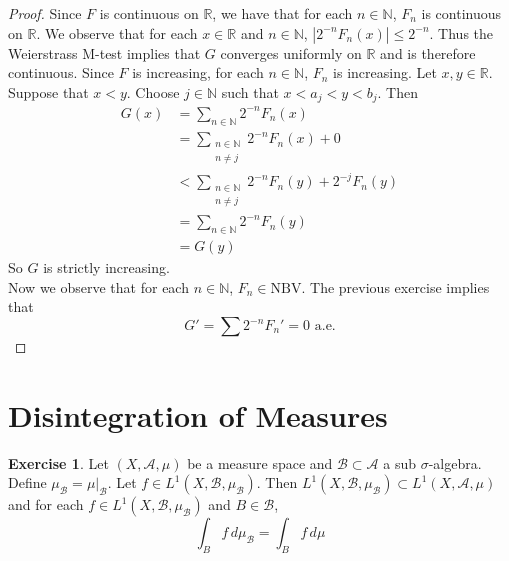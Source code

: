 \documentclass{book}
\theoremstyle{definition}
\newtheorem{ex}[definition]{Exercise}
\newcommand{\sig}{\sigma}
\newcommand{\N}{\mathbb{N}}
\newcommand{\R}{\mathbb{R}}
\newcommand{\MA}{\mathcal{A}}
\newcommand{\MB}{\mathcal{B}}
\newcommand{\lex}[1]{\label{ex:#1}}
\DeclareMathOperator*{\0}{\mbf{0}}
\DeclareMathOperator*{\1}{\mbf{1}}
\newcommand{\dmu}{\, d \mu}
\newcommand{\NBV}{\text{NBV}}
\begin{document}
	\begin{proof}
		Since $F$ is continuous on $\R$, we have that for each $n \in \N$, $F_n$ is continuous on $\R$. We observe that for each $x \in \R$ and $n \in \N$, $|2^{-n}F_n(x)| \leq 2^{-n}$. Thus the Weierstrass M-test implies that $G$ converges uniformly on $\R$ and is therefore continuous. Since $F$ is increasing, for each $n \in \N$, $F_n$ is increasing. Let $x, y \in \R$. Suppose that $x<y$. Choose $j \in \N$ such that $x<a_j<y<b_j$. Then 
		\begin{align*}
			G(x) 
			&= \sum_{n \in \N}2^{-n}F_n(x)\\
			&= \sum_{\substack{n \in \N\\ n \neq j}}2^{-n}F_n(x) + 0\\
			& < \sum_{\substack{n \in \N\\ n \neq j}}2^{-n}F_n(y) + 2^{-j}F_n(y)\\
			&=\sum_{n \in \N}2^{-n}F_n(y)\\
			&=G(y)
		\end{align*}
		So $G$ is strictly increasing.\\
		Now we observe that for each $n \in \N$, $F_n \in \NBV$. The previous exercise implies that $$G' = \sum 2^{-n}F_n'=0 \text{ a.e.}$$
	\end{proof}
	
	
	
	
	
	
	
	
	
	
	
	
	
	
	
	
	
	
	
	
	
	
	
	
	
	
	
	
	
	
	
	
	
	
	\newpage
	\section{Disintegration of Measures}
	
	\begin{ex} \lex{00000} 
		Let $(X, \MA, \mu)$ be a measure space and $\MB \subset \MA$ a sub $\sig$-algebra. Define $\mu_{\MB} = \mu|_{\MB}$. Let $f \in L^1(X, \MB, \mu_{\MB})$. Then $ L^1(X, \MB, \mu_{\MB}) \subset L^1(X, \MA, \mu)$ and for each $f \in L^1(X, \MB, \mu_{\MB})$ and $B \in \MB$, 
		$$\int_B f \dmu_{\MB} = \int_B f \dmu$$
	\end{ex}
	
\end{document}
